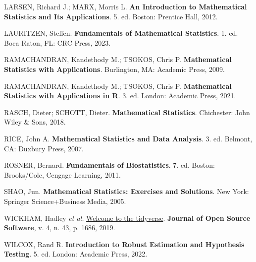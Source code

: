 \documentclass[
  letterpaper,
  DIV=11,
  numbers=noendperiod]{scrreprt}
\newlength{\cslhangindent}
\newenvironment{CSLReferences}[2] %
 {\begin{list}{}{%
  \setlength{\itemindent}{0pt}
  \setlength{\leftmargin}{0pt}
  \setlength{\parsep}{0pt}
  \ifodd #1
   \setlength{\leftmargin}{\cslhangindent}
   \setlength{\itemindent}{-1\cslhangindent}
  \fi
  \setlength{\itemsep}{#2\baselineskip}}}
 {\end{list}}
\begin{document}
\begin{CSLReferences}{0}{1}
LARSEN, Richard J.; MARX, Morris L. \textbf{An Introduction to
Mathematical Statistics and Its Applications}. 5. ed. Boston: Prentice
Hall, 2012.

LAURITZEN, Steffen. \textbf{Fundamentals of Mathematical Statistics}. 1.
ed. Boca Raton, FL: CRC Press, 2023.

RAMACHANDRAN, Kandethody M.; TSOKOS, Chris P. \textbf{Mathematical
Statistics with Applications}. Burlington, MA: Academic Press, 2009.

RAMACHANDRAN, Kandethody M.; TSOKOS, Chris P. \textbf{Mathematical
Statistics with Applications in {R}}. 3. ed. London: Academic Press,
2021.

RASCH, Dieter; SCHOTT, Dieter. \textbf{Mathematical Statistics}.
Chichester: John Wiley \& Sons, 2018.

RICE, John A. \textbf{Mathematical Statistics and Data Analysis}. 3. ed.
Belmont, CA: Duxbury Press, 2007.

ROSNER, Bernard. \textbf{Fundamentals of Biostatistics}. 7. ed. Boston:
Brooks/Cole, Cengage Learning, 2011.

SHAO, Jun. \textbf{Mathematical Statistics: Exercises and Solutions}.
New York: Springer Science+Business Media, 2005.

WICKHAM, Hadley \emph{et al.}
\href{https://doi.org/10.21105/joss.01686}{Welcome to the {tidyverse}}.
\textbf{Journal of Open Source Software}, v. 4, n. 43, p. 1686, 2019.

WILCOX, Rand R. \textbf{Introduction to Robust Estimation and Hypothesis
Testing}. 5. ed. London: Academic Press, 2022.

\end{CSLReferences}
\end{document}
